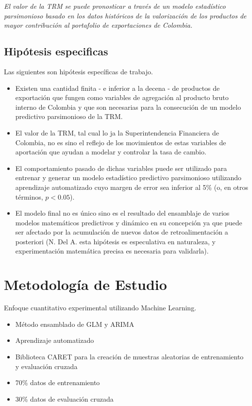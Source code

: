 \emph{El valor de la TRM se puede pronosticar a través de un modelo estadístico parsimonioso basado en los datos históricos de la valorización de los productos de mayor contribución al portafolio de exportaciones de Colombia.}

\subsection{Hipótesis especificas}
Las siguientes son hipótesis específicas de trabajo.

\begin{itemize}
	\item Existen una cantidad finita - e inferior a la decena - de productos de exportación que fungen como variables de agregación al producto bruto interno de Colombia y que son necesarias para la consecución de un modelo predictivo parsimonioso de la TRM.
	\item El valor de la TRM, tal cual lo ja la Superintendencia Financiera de Colombia, no es sino el reflejo de los movimientos de estas variables de aportación que ayudan a modelar y controlar la tasa de cambio.
	\item El comportamiento pasado de dichas variables puede ser utilizado para entrenar y generar un modelo estadístico predictivo parsimonioso utilizando aprendizaje automatizado cuyo margen de error sea inferior al 5\% (o, en otros términos, \(p < 0.05\)).
	\item El modelo final no es único sino es el resultado del ensamblaje de varios modelos matemáticos predictivos y dinámico en su concepción ya que puede ser afectado por la acumulación de nuevos datos de retroalimentación a posteriori (N. Del A. esta hipótesis es especulativa en naturaleza, y experimentación matemática precisa es necesaria para validarla).
\end{itemize}

\section{Metodología de Estudio}
Enfoque cuantitativo experimental utilizando Machine Learning.

\begin{itemize}
	\item Método ensamblado de GLM y ARIMA
	\item Aprendizaje automatizado
	\item Biblioteca CARET para la creación de muestras aleatorias de entrenamiento y evaluación cruzada
	\item 70\% datos de entrenamiento
	\item 30\% datos de evaluación cruzada
\end{itemize}

